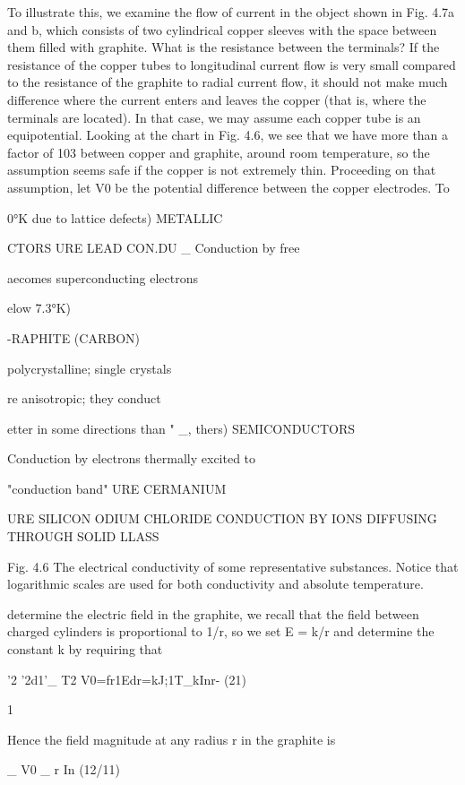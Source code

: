 To illustrate this, we examine the flow of current in the object
shown in Fig. 4.7a and b, which consists of two cylindrical copper
sleeves with the space between them filled with graphite. What is
the resistance between the terminals? If the resistance of the copper
tubes to longitudinal current flow is very small compared to the
resistance of the graphite to radial current flow, it should not make
much difference where the current enters and leaves the copper (that
is, where the terminals are located). In that case, we may assume
each copper tube is an equipotential. Looking at the chart in Fig. 4.6,
we see that we have more than a factor of 103 between copper and
graphite, around room temperature, so the assumption seems safe if
the copper is not extremely thin. Proceeding on that assumption, let
V0 be the potential difference between the copper electrodes. To

0°K due to lattice defects) METALLIC

CTORS
URE LEAD CON.DU
_ Conduction by free

aecomes superconducting electrons

elow 7.3°K)

-RAPHITE (CARBON)

polycrystalline; single crystals

re anisotropic; they conduct

etter in some directions than " _,
thers) SEMICONDUCTORS

Conduction by electrons
thermally excited to

"conduction band"
URE CERMANIUM

URE SILICON
ODIUM
CHLORIDE CONDUCTION BY
IONS DIFFUSING
THROUGH SOLID
LLASS

Fig. 4.6 The electrical conductivity of some representative
substances. Notice that logarithmic scales are used for both
conductivity and absolute temperature.

determine the electric field in the graphite, we recall that the field
between charged cylinders is proportional to 1/r, so we set E = k/r
and determine the constant k by requiring that

'2 '2d1'_ T2
V0=fr1Edr=kJ;1T_kInr- (21)
\begin{equation}
\end{equation}

1

Hence the field magnitude at any radius r in the graphite is

_ V0
_ r In (12/11)

